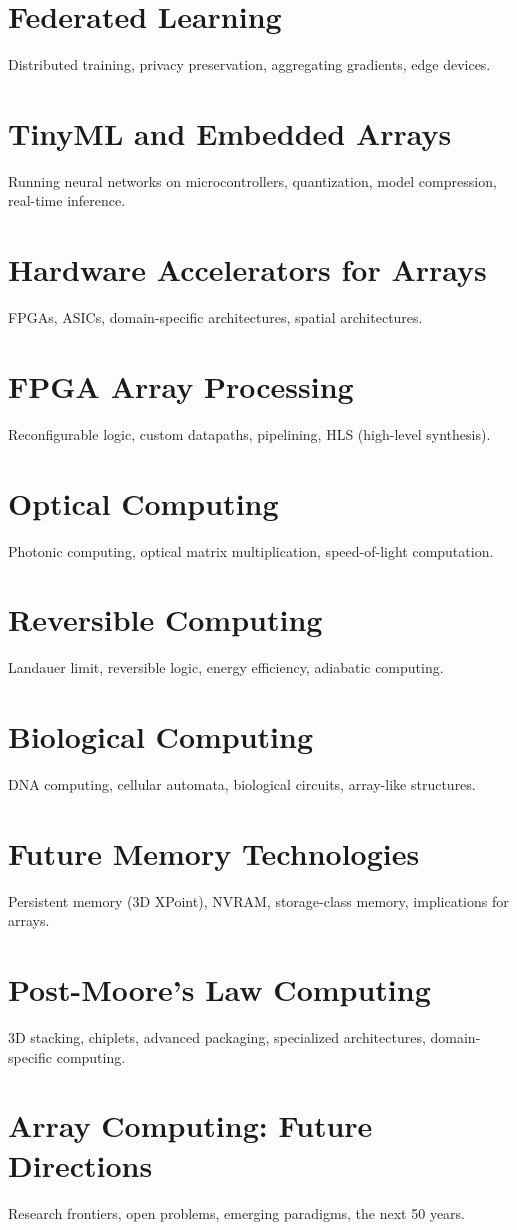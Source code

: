 \chapter{Federated Learning}
Distributed training, privacy preservation, aggregating gradients, edge devices.

\chapter{TinyML and Embedded Arrays}
Running neural networks on microcontrollers, quantization, model compression, real-time inference.

\chapter{Hardware Accelerators for Arrays}
FPGAs, ASICs, domain-specific architectures, spatial architectures.

\chapter{FPGA Array Processing}
Reconfigurable logic, custom datapaths, pipelining, HLS (high-level synthesis).

\chapter{Optical Computing}
Photonic computing, optical matrix multiplication, speed-of-light computation.

\chapter{Reversible Computing}
Landauer limit, reversible logic, energy efficiency, adiabatic computing.

\chapter{Biological Computing}
DNA computing, cellular automata, biological circuits, array-like structures.

\chapter{Future Memory Technologies}
Persistent memory (3D XPoint), NVRAM, storage-class memory, implications for arrays.

\chapter{Post-Moore's Law Computing}
3D stacking, chiplets, advanced packaging, specialized architectures, domain-specific computing.

\chapter{Array Computing: Future Directions}
Research frontiers, open problems, emerging paradigms, the next 50 years.